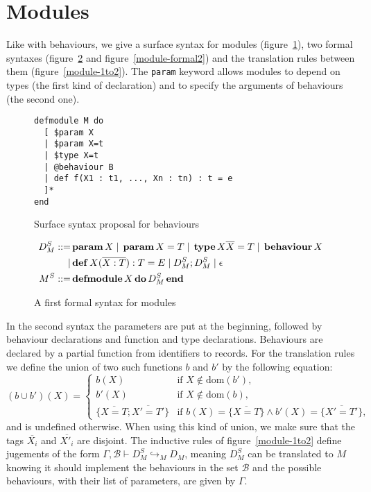 \documentclass[a4paper,10pt]{article}
\newcommand{\kw}[1]{%
  \,\text{\textbf{#1}}\,
}
\newcommand{\pipe}{%
\; | \;
}
\begin{document}
\section{Modules}
Like with behaviours, we give a surface syntax for modules
(figure~\ref{module-surface}), two formal syntaxes (figure~\ref{module-formal1}
and figure~\ref{module-formal2}) and the translation rules between them
(figure~\ref{module-1to2}). The \texttt{param} keyword allows modules to depend
on types (the first kind of declaration) and to specify the arguments of
behaviours (the second one).
\begin{figure}[h]
\begin{verbatim}
defmodule M do
  [ $param X
  | $param X=t
  | $type X=t
  | @behaviour B
  | def f(X1 : t1, ..., Xn : tn) : t = e
  ]*
end
\end{verbatim}
\caption{Surface syntax proposal for behaviours}\label{module-surface}
\end{figure}
\begin{figure}[h]
  \begin{align*}
    D_M^S ::=& \kw{param} X \pipe \kw{param} X = T
    \pipe \kw{type} X \overline{X} = T \pipe\kw{behaviour} X \\
    |& \kw{def} X(\overline{X : T}) : T = E \pipe D_M^S; D_M^S \pipe \epsilon \\
    M^S ::=& \kw{defmodule} X \kw{do} D_M^S \kw{end}
  \end{align*}
  \caption{A first formal syntax for modules}\label{module-formal1}
\end{figure}

In the second syntax the parameters are put at the beginning, followed by
behaviour declarations and function and type declarations. Behaviours are
declared by a partial function from identifiers to records. For the translation
rules we define the union of two such functions $b$ and $b'$ by the following
equation:
\[
(b \cup b')(X) = \begin{cases} b(X) & \text{if } X  \notin \text{dom}(b'),\\
  b'(X) & \text{if } X  \notin \text{dom}(b),\\
  \{\overline{X=T};\overline{X'=T'}\}& \text{if }
  b(X)=\{\overline{X=T}\} \wedge b'(X)=\{\overline{X'=T'}\},
\end{cases}
\]
and is undefined otherwise. When using this kind of union, we make sure that the
tags $\overline{X_i}$ and $\overline{X'_i}$ are disjoint. The inductive rules of
figure~\ref{module-1to2} define jugements of the form $\Gamma,\mathcal{B}\vdash
D_M^S\hookrightarrow_M D_M$, meaning $D_M^S$ can be translated to $M$ knowing it
should implement the behaviours in the set $\mathcal{B}$ and the possible
behaviours, with their list of parameters, are given by $\Gamma$.
\end{document}
